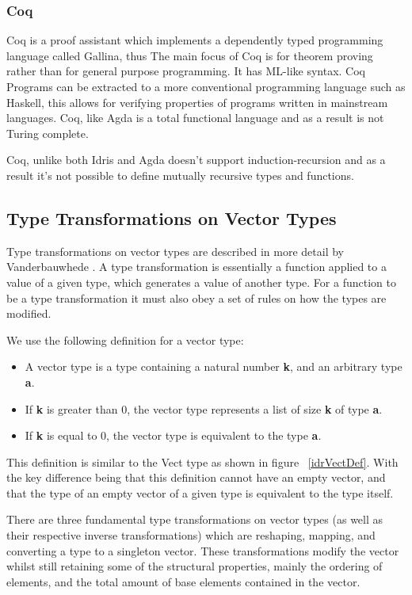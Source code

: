 \subsubsection{Coq}
Coq\cite{coq} is a proof assistant which implements a dependently typed programming language called Gallina, 
thus The main focus of Coq is for theorem proving rather than for general purpose programming. It has ML-like syntax. 
Coq Programs can be extracted to a more conventional programming language such as Haskell, this allows for verifying properties of programs
written in mainstream languages.
Coq, like Agda is a total functional language and as a result is not Turing complete. 

Coq, unlike both Idris and Agda doesn't support induction-recursion\cite{inductionrecur} and as a result it's not
possible to define mutually recursive types and functions.




\subsection{Type Transformations on Vector Types}
Type transformations on vector types are described in more detail by Vanderbauwhede \cite{transformations}.
A type transformation is essentially a function applied to a value of a given type, which generates a value of 
another type. For a function to be a type transformation it must also obey a set of rules on how
the types are modified. 

We use the following definition for a vector type:

\begin{itemize}
\item A vector type is a type containing a natural number \textbf{k}, and an arbitrary type \textbf{a}.  
\item If \textbf{k} is greater than 0, the vector type represents a list of size \textbf{k} of type \textbf{a}.
\item If \textbf{k} is equal to 0, the vector type is equivalent to the type \textbf{a}.
\end{itemize}

This definition is similar to the Vect type as shown in figure ~\ref{idrVectDef}. With the key difference being
that this definition cannot have an empty vector, and that the type of an empty vector of a given
type is equivalent to the type itself.

There are three fundamental type transformations on vector types (as well
as their respective inverse transformations) which are reshaping, mapping, and converting a type to a singleton vector. 
These transformations modify the vector whilst still retaining some of the structural properties, mainly the ordering of elements,
and the total amount of base elements contained in the vector.

